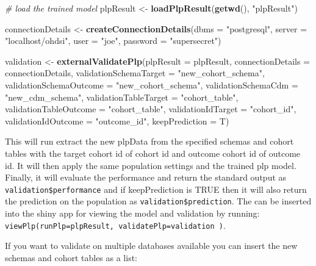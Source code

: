 \documentclass[]{article}
\newenvironment{Shaded}{\begin{snugshade}}{\end{snugshade}}
\newcommand{\KeywordTok}[1]{\textcolor[rgb]{0.13,0.29,0.53}{\textbf{#1}}}
\newcommand{\DataTypeTok}[1]{\textcolor[rgb]{0.13,0.29,0.53}{#1}}
\newcommand{\StringTok}[1]{\textcolor[rgb]{0.31,0.60,0.02}{#1}}
\newcommand{\CommentTok}[1]{\textcolor[rgb]{0.56,0.35,0.01}{\textit{#1}}}
\newcommand{\NormalTok}[1]{#1}
\begin{document}
\begin{Shaded}
\begin{Highlighting}[]
\CommentTok{# load the trained model}
\NormalTok{plpResult <-}\StringTok{ }\KeywordTok{loadPlpResult}\NormalTok{(}\KeywordTok{getwd}\NormalTok{(), }\StringTok{"plpResult"}\NormalTok{)}

\NormalTok{connectionDetails <-}\StringTok{ }\KeywordTok{createConnectionDetails}\NormalTok{(}\DataTypeTok{dbms =} \StringTok{"postgresql"}\NormalTok{, }\DataTypeTok{server =} \StringTok{"localhost/ohdsi"}\NormalTok{, }
    \DataTypeTok{user =} \StringTok{"joe"}\NormalTok{, }\DataTypeTok{password =} \StringTok{"supersecret"}\NormalTok{)}

\NormalTok{validation <-}\StringTok{ }\KeywordTok{externalValidatePlp}\NormalTok{(}\DataTypeTok{plpResult =}\NormalTok{ plpResult, }\DataTypeTok{connectionDetails =}\NormalTok{ connectionDetails, }
    \DataTypeTok{validationSchemaTarget =} \StringTok{"new_cohort_schema"}\NormalTok{, }\DataTypeTok{validationSchemaOutcome =} \StringTok{"new_cohort_schema"}\NormalTok{, }
    \DataTypeTok{validationSchemaCdm =} \StringTok{"new_cdm_schema"}\NormalTok{, }\DataTypeTok{validationTableTarget =} \StringTok{"cohort_table"}\NormalTok{, }
    \DataTypeTok{validationTableOutcome =} \StringTok{"cohort_table"}\NormalTok{, }\DataTypeTok{validationIdTarget =} \StringTok{"cohort_id"}\NormalTok{, }
    \DataTypeTok{validationIdOutcome =} \StringTok{"outcome_id"}\NormalTok{, }\DataTypeTok{keepPrediction =}\NormalTok{ T)}
\end{Highlighting}
\end{Shaded}

This will run extract the new plpData from the specified schemas and
cohort tables with the target cohort id of cohort id and outcome cohort
id of outcome id. It will then apply the same population settings and
the trained plp model. Finally, it will evaluate the performance and
return the standard output as \texttt{validation\$performance} and if
keepPrediction is TRUE then it will also return the prediction on the
population as \texttt{validation\$prediction}. The can be inserted into
the shiny app for viewing the model and validation by running:
\texttt{viewPlp(runPlp=plpResult,\ validatePlp=validation\ )}.

If you want to validate on multiple databases available you can insert
the new schemas and cohort tables as a list:
\end{document}
